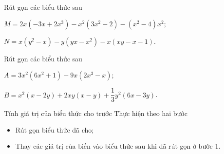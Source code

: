 \begin{vd}%
    Rút gọn các biểu thức sau
    \begin{listEX}[1]
        \item $M=2x(-3x+2x^3)-x^2(3x^2-2)-(x^2-4)x^2$; 
        \item $N=x(y^2-x)-y(yx-x^2)-x(xy-x-1)$. 
    \end{listEX}
\end{vd}
\begin{vd}%
    Rút gọn các biểu thức sau
    \begin{listEX}[1]
        \item $A=3x^2(6x^2+1)-9x(2x^3-x)$; 
        \item $B=x^2(x-2y)+2xy(x-y)+\dfrac{1}{3}y^2(6x-3y)$. 
    \end{listEX}
\end{vd}
\begin{dang}{Tính giá trị của biểu thức cho trước}
Thực hiện theo hai bước
    \begin{itemize}
        \item Rút gọn biểu thức đã cho;
        \item Thay các giá trị của biến vào biểu thức sau khi đã rút gọn ở bước 1.
    \end{itemize}
\end{dang}

